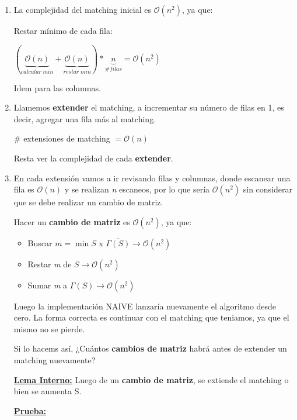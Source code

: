 \documentclass[12pt,a4paper]{report}
\begin{document}
			\begin{enumerate}
				\item La complejidad del matching inicial es $\mathcal{O}(n^{2})$, ya que:

					Restar mínimo de cada fila:
					\begin{center}
						$(\underbrace{\mathcal{O}(n)}_{calcular \; min} + \underbrace{\mathcal{O}(n)}_{restar \; min}) * \underbrace{n}_{\# filas} = \mathcal{O}(n^{2})$
					\end{center}

				Idem para las columnas.

				\item Llamemos \textbf{extender} el matching, a incrementar su número de filas en 1, es decir, agregar una fila más al matching.
				\begin{center}
					$\#$ extensiones de matching $= \mathcal{O}(n)$
				\end{center}

				Resta ver la complejidad de cada \textbf{extender}.

				\item En cada extensión vamos a ir revisando filas y columnas, donde escanear una fila es $\mathcal{O}(n)$ y se realizan \textit{n} escaneos, por lo que sería $\mathcal{O}(n^{2})$ sin considerar que se debe realizar un cambio de matriz.

				Hacer un \textbf{cambio de matriz} es $\mathcal{O}(n^{2})$, ya que:
				\begin{itemize}
					\item Buscar $\textit{m} = \min S$ x $\overline{\Gamma(S)} \rightarrow \mathcal{O}(n^{2})$
					\item Restar \textit{m} de $S \rightarrow \mathcal{O}(n^{2})$
					\item Sumar \textit{m} a $\Gamma(S) \rightarrow \mathcal{O}(n^{2})$
				\end{itemize}

				Luego la implementación NAIVE lanzaría nuevamente el algoritmo desde cero. La forma correcta es continuar con el matching que teniamos, ya que el mismo no se pierde.

				Si lo hacems así, ¿Cuántos \textbf{cambios de matriz} habrá antes de extender un matching nuevamente?

				\underline{\textbf{Lema Interno:}} Luego de un \textbf{cambio de matriz}, se extiende el matching o bien se aumenta S.

				\underline{\textbf{Prueba:}}


\end{enumerate}
\end{document}
